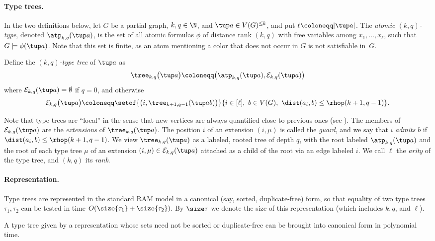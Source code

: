 \paragraph{Type trees.}
In the two definitions below, let $G$ be a partial graph, $k,q\in\N$, and $\tup a\in V(G)^{\le k}$, and put $\ell\coloneqq|\tup a|$.
The \emph{atomic $(k,q)$-type}, denoted $\atp_{k,q}(\tup a)$, is the set of all atomic formulas $\phi$
of distance rank \((k,q)\)
with free variables among $x_1,\ldots,x_\ell$, such that $G\models\phi(\tup a)$. Note that this set is finite, as an atom mentioning a color that does not occur in $G$ is not satisfiable in~$G$.

Define the \emph{$(k,q)$-type tree} of $\tup a$ as
\[
\tree_{k,q}\bigl(\tup a\bigr)
\coloneqq
\bigl(\atp_{k,q}(\tup a),\mathcal E_{k,q}(\tup a)\bigr)
\]
where $\mathcal E_{k,q}(\tup a)=\emptyset$ if $q=0$, and otherwise
\[
\mathcal E_{k,q}\bigl(\tup a\bigr)
\coloneqq
\setof{\bigl(i,\tree_{k+1,q-1}(\tup a b)\bigr)}{i\in[\ell],\ b\in V(G),\ \dist(a_i,b)\le\rhop(k+1,q-1)}.
\]

Note that type trees are ``local'' in the sense that new vertices are always quantified close to previous ones (see ).
The members of $\mathcal E_{k,q}(\tup a)$ are the \emph{extensions} of $\tree_{k,q}(\tup a)$. The position $i$ of an extension $(i,\mu)$ is called the \emph{guard}, and we say that $i$ \emph{admits} $b$ if $\dist(a_i,b)\le\rhop(k+1,q-1)$.
We view $\tree_{k,q}(\tup a)$ as a labeled, rooted tree
 of depth $q$,
with the root labeled $\atp_{k,q}(\tup a)$ and the root of each type tree $\mu$ of an extension $(i,\mu)\in \mathcal E_{k,q}(\tup a)$ attached as a child of the root via an edge labeled $i$.
We call $\ell$ the \emph{arity} of the type tree, and $(k,q)$ its \emph{rank}.

\paragraph{Representation.}
Type trees are represented in the standard RAM model in a canonical (say, sorted,
duplicate-free) form, so that equality of two type trees $\tau_1,\tau_2$ can be
tested in time $O(\size{\tau_1}+\size{\tau_2})$.
By $\size\tau$ we denote the size of this representation (which includes $k,q$, and $\ell$).

\begin{observation}\label{obs:canonical}
A type tree given by a representation whose sets need not be sorted or duplicate-free can be brought into canonical form in polynomial time.
\end{observation}

